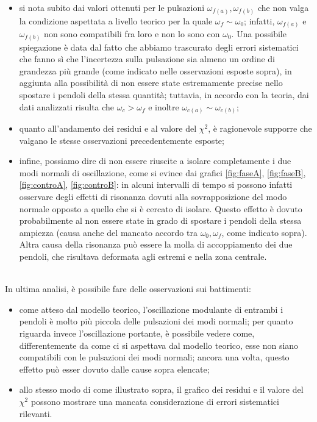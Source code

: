 \documentclass{article}
\begin{document}
\begin{itemize}
    \item si nota subito dai valori ottenuti per le pulsazioni $\omega_{f(a)}, \omega_{f(b)}$ che non valga la condizione aspettata a livello teorico per la quale $\omega_f \sim \omega_0$; infatti, $\omega_{f(a)}$ e $\omega_{f(b)}$ non sono compatibili fra loro e non lo sono con $\omega_0$. Una possibile spiegazione è data dal fatto che abbiamo trascurato degli errori sistematici che fanno sì che l'incertezza sulla pulsazione sia almeno un ordine di grandezza più grande (come indicato nelle osservazioni esposte sopra), in aggiunta alla possibilità di non essere state estremamente precise nello spostare i pendoli della stessa quantità; tuttavia, in accordo con la teoria, dai dati analizzati risulta che $\omega_c > \omega_f$ e inoltre $\omega_{c(a)} \sim \omega_{c(b)}$;
    \item quanto all'andamento dei residui e al valore del $\chi^2$, è ragionevole supporre che valgano le stesse osservazioni precedentemente esposte;
    \item infine, possiamo dire di non essere riuscite a isolare completamente i
    due modi normali di oscillazione, come si evince dai grafici \ref{fig:faseA}, \ref{fig:faseB}, \ref{fig:controA}, \ref{fig:controB}: in alcuni intervalli di tempo si possono infatti osservare degli effetti di risonanza dovuti alla sovrapposizione del modo normale opposto a quello che si è cercato di isolare. Questo effetto è dovuto probabilmente al non essere state in grado di spostare i pendoli della stessa ampiezza (causa anche del mancato accordo tra $\omega_0, \omega_f$, come indicato sopra). Altra causa della risonanza può essere la molla di accoppiamento dei due pendoli, che risultava deformata agli estremi e nella zona centrale. 
\end{itemize}
\\
In ultima analisi, è possibile fare delle osservazioni sui battimenti:
\begin{itemize}
    \item come atteso dal modello teorico, l'oscillazione modulante di entrambi i pendoli è molto più piccola delle pulsazioni dei modi normali; per quanto riguarda invece l'oscillazione portante, è possibile vedere come, differentemente da come ci si aspettava dal modello teorico, esse non siano compatibili con le pulsazioni dei modi normali; ancora una volta, questo effetto può esser dovuto dalle cause sopra elencate;
    \item allo stesso modo di come illustrato sopra, il grafico dei residui e il valore del $\chi^2$ possono mostrare una mancata considerazione di errori sistematici rilevanti.
\end{itemize}
\end{document}
